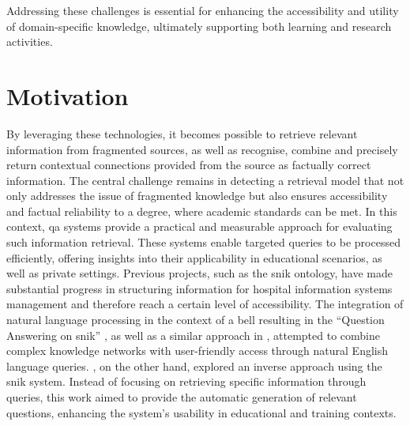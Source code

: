 Addressing these challenges is essential for enhancing the accessibility and utility of domain-specific knowledge, ultimately supporting both learning and research activities. 

\section{Motivation}\label{motivation}
By leveraging these technologies, it becomes possible to retrieve relevant information from fragmented sources, as well as recognise, combine and precisely return contextual connections provided from the source as factually correct information. 
The central challenge remains in detecting a retrieval model that not only addresses the issue of fragmented knowledge but also ensures accessibility and factual reliability to a degree, where academic standards can be met. 
In this context, \ac{qa} systems provide a practical and measurable approach for evaluating such information retrieval. 
These systems enable targeted queries to be processed efficiently, offering insights into their applicability in educational scenarios, as well as private settings.
% 
Previous projects, such as the \ac{snik} ontology, have made substantial progress in structuring information for hospital information systems management and therefore reach a certain level of accessibility. 
The integration of natural language processing in the context of a \ac{bell} resulting in the \enquote{Question Answering on \ac{snik}} \citep{hannesbell, hannesbell_skill}, as well as a similar approach in \citet{snikquiz}, attempted to combine complex knowledge networks with user-friendly access through natural English language queries. \citet{arneba}, on the other hand, explored an inverse approach using the \ac{snik} system. Instead of focusing on retrieving specific information through queries, this work aimed to provide the automatic generation of relevant questions, enhancing the system's usability in educational and training contexts.
 
